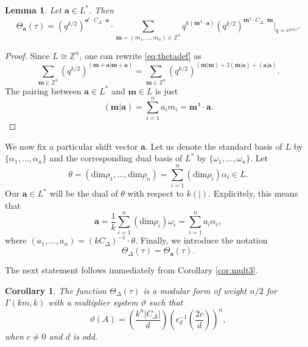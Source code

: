 \documentclass{article}
\newtheorem{lemma}[theorem]{Lemma}
\newtheorem{corollary}[theorem]{Corollary}
\theoremstyle{definition}
\newcommand{\ZZ} {{\mathbb Z}}		%
\renewcommand{\top}{\,\mathsf{t}}
\begin{document}
\begin{lemma} Let $\mathbf{a} \in L^{\ast}$. Then
\[
\Theta_{\mathbf{a}}(\tau)= {(q^{k/2})^{\mathbf{a}^{t} \cdot C_\Delta \cdot \mathbf{a}}}
\cdot \sum_{ \mathbf{m}=(m_1,\dots,m_n) \in  \ZZ^n } {q^{ k({\mathbf{m}^ {\top}} \cdot 
\mathbf{a})
}} {(q^{k/2})^{{\mathbf{m}^ {\top}} \cdot C_\Delta \cdot \mathbf{m}}}
 \Big|_{q=\mathrm{e}^{2 \pi
i \tau}}.\]
	\label{lem:thetadef2}
\end{lemma}
\begin{proof}
	Since $L \cong  \ZZ^n $, one can rewrite \eqref{eq:thetadef}
	as
\[ \sum_{\mathbf{m} \in  \ZZ^n} (q^{k/2})^{(\mathbf{m+\mathbf{a}} | 
\mathbf{m+\mathbf{a}})} =
\sum_{\mathbf{m} \in  \ZZ^n} (q^{k/2})^{(\mathbf{m}|
\mathbf{m})+2(\mathbf{m}|\mathbf{a})+(\mathbf{a}|\mathbf{a})} 
.
\]
The pairing between $\mathbf{a} \in L^{\ast}$ and $\mathbf{m} \in L$ is just
\[(\mathbf{m}|\mathbf{a})=\sum_{i=1}^n a_i m_i = \mathbf{m}^ {\top} \cdot \mathbf{a}.\]
\end{proof}

We now fix a particular shift vector $\mathbf{a}$. Let us denote the standard basis of $L$ 
by $\{\alpha_1, \dots, \alpha_n\}$ and the corresponding dual basis of $L^{\ast}$ by 
$\{\omega_1, \dots, \omega_n\}$.
Let
\begin{equation} 
\label{eq:thetadef}
\theta=( \mathrm{dim} \rho_1 ,\dots, \mathrm{dim} \rho_n) = \sum_{i=1}^n 
(\mathrm{dim} \rho_i) \alpha_i \in L.\end{equation}
Our $\mathbf{a} \in L^{\ast}$ will be the dual of $\theta$ with respect to $k(|)$. 
Explicitely, this means that
\begin{equation}
\mathbf{a}= \frac{1}{k}\sum_{i=1}^n (\mathrm{dim} \rho_i) 
\omega_i=\sum_{i=1}^n a_i \alpha_i, 
\label{eq:zetasub}
\end{equation}
where $(a_1,\dots,a_n)=(kC_\Delta)^{-1} \cdot \theta$.
Finally, we introduce the notation
\[ \Theta_{\Delta}(\tau)=\Theta_{\mathbf{a}}(\tau). \]

The next statement follows immediately from Corollary \ref{cor:mult3}.
\begin{corollary}
\label{cor:thetazetamult} 
The function $\Theta_{\Delta}(\tau)$ is a modular form of weight $n/2$ for 
$\Gamma(km,k)$ with a multiplier system $\vartheta$ such that
\[ \vartheta(A)=\left(\frac{k^n|C_{\Delta}|}{d}\right)
\left(\epsilon^{-1}_d \left(\frac{2c}{d}\right)\right)^n, \]
when $c\neq 0$ and $d$ is odd.
\end{corollary}
\end{document}
